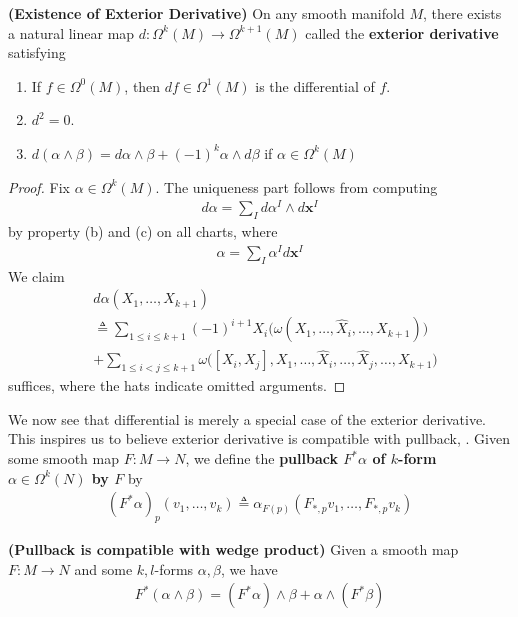 \documentclass{report}
\begin{document}
\begin{theorem}
\label{Existence of Exterior Derivative}
\textbf{(Existence of Exterior Derivative)} On any smooth manifold $M$, there exists a natural linear map  $d:\Omega^k(M)\rightarrow \Omega^{k+1}(M)$ called the \textbf{exterior derivative} satisfying 
\begin{enumerate}[label=(\alph*)]
  \item If $f \in \Omega^0(M)$, then $df\in \Omega^1(M)$ is the differential of $f$. 
  \item $d^2=0$.
  \item  $d (\alpha \wedge  \beta  )=d\alpha \wedge  \beta +(-1)^k \alpha \wedge  d\beta   $ if $ \alpha  \in \Omega^k(M)$
\end{enumerate}
\end{theorem}
\begin{proof}
  Fix $\alpha  \in \Omega^k(M)$. The uniqueness part follows from computing 
  \begin{align*}
  d\alpha =\sum_I d\alpha^I \wedge  d\textbf{x}^I 
  \end{align*}
by property (b) and (c) on all charts, where 
\begin{align*}
\alpha = \sum_I \alpha^I d\textbf{x}^I
\end{align*}
We claim 
\begin{align*}
&d\alpha (X_1,\dots ,X_{k+1})\\
&\triangleq \sum_{1\leq i\leq k+1}(-1)^{i+1}X_i \Big(\omega (X_1,\dots ,\widehat{X}_i,\dots ,X_{k+1}) \Big) \\
&+\sum_{1\leq i<j\leq k+1}\omega \Big( [X_i,X_j],X_1 ,\dots ,\widehat{X}_i,\dots ,\widehat{X}_j,\dots ,X_{k+1} \Big)
\end{align*}
suffices, where the hats indicate omitted arguments.  
\end{proof}
\begin{mdframed}
We now see that differential is merely a special case of the exterior derivative. This inspires us to believe exterior derivative is compatible with pullback, . Given some smooth map $F:M\rightarrow N$, we define the \textbf{pullback $F^*\alpha $ of $k$-form  $\alpha \in \Omega^k(N)$ by $F$} by 
\begin{align*}
  (F^* \alpha )_p(v_1,\dots ,v_k)\triangleq \alpha_{F(p)}(F_{*,p}v_1,\dots ,F_{*,p}v_k)
\end{align*}
\end{mdframed}
\begin{theorem}
\label{Picw}
\textbf{(Pullback is compatible with wedge product)} Given a smooth map $F:M\rightarrow N$ and some $k,l$-forms  $\alpha ,\beta $, we have 
\begin{align*}
F^* (\alpha \wedge  \beta  )=(F^* \alpha) \wedge  \beta + \alpha \wedge  (F^* \beta ) 
\end{align*}
\end{theorem}
\end{document}
